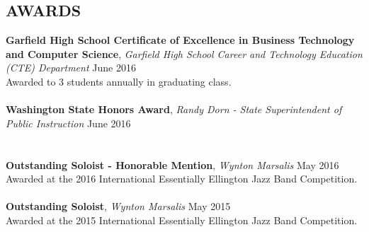 \documentclass[line,margin]{res}
\begin{document}
\begin{resume}
	\section{AWARDS}
	\textbf{Garfield High School Certificate of Excellence in Business Technology and Computer Science}, {\sl Garfield High School Career and Technology Education (CTE) Department} \hfill June 2016 \\
	Awarded to 3 students annually in graduating class. \\\\
	\textbf{Washington State Honors Award}, {\sl Randy Dorn - State Superintendent of Public Instruction} \hfill June 2016 \\
	\\\\
	\textbf{Outstanding Soloist - Honorable Mention}, {\sl Wynton Marsalis} \hfill May 2016 \\
	Awarded at the 2016 International Essentially Ellington Jazz Band Competition. \\\\
	\textbf{Outstanding Soloist}, {\sl Wynton Marsalis} \hfill May 2015 \\
	Awarded at the 2015 International Essentially Ellington Jazz Band Competition. \\\\
	\ 
\end{resume}
\end{document}

